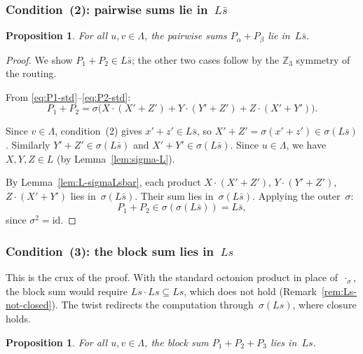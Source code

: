 \documentclass[twoside,english]{paper}
\numberwithin{equation}{section}
\numberwithin{figure}{section}
\newtheorem{proposition}[theorem]{Proposition}
\theoremstyle{definition}
\theoremstyle{remark}
\newcommand{\ZZ}{\mathbb{Z}}
\newcommand{\LL}{\Lambda}             %
\begin{document}
\subsubsection{Condition~(2): pairwise sums lie
in~\texorpdfstring{$L\bar{s}$}{L s-bar}}

\begin{proposition}\label{prop:cond2}
For all $u, v \in \LL$, the pairwise sums $P_\alpha + P_\beta$ lie
in~$L\bar{s}$.
\end{proposition}

\begin{proof}
We show $P_1 + P_2 \in L\bar{s}$; the other two cases follow by the
$\ZZ_3$ symmetry of the routing.

From \eqref{eq:P1-std}--\eqref{eq:P2-std}:
\begin{equation}\label{eq:disp3}
  P_1 + P_2 = \sigma\bigl(X \cdot (X' + Z') + Y \cdot (Y' + Z')
    + Z \cdot (X' + Y')\bigr).
\end{equation}

Since $v \in \LL$, condition~(2) gives $x' + z' \in L\bar{s}$, so
$X' + Z' = \sigma(x' + z') \in \sigma(L\bar{s})$.  Similarly
$Y' + Z' \in \sigma(L\bar{s})$ and $X' + Y' \in \sigma(L\bar{s})$.
Since $u \in \LL$, we have $X, Y, Z \in L$ (by Lemma~\ref{lem:sigma-L}).

By Lemma~\ref{lem:L-sigmaLsbar}, each product $X \cdot (X'+Z')$, $Y \cdot (Y'+Z')$,
$Z \cdot (X'+Y')$ lies in~$\sigma(L\bar{s})$.  Their sum lies
in~$\sigma(L\bar{s})$.  Applying the outer~$\sigma$:
\begin{equation}\label{eq:disp4}
  P_1 + P_2 \in \sigma(\sigma(L\bar{s})) = L\bar{s},
\end{equation}
since $\sigma^2 = \mathrm{id}$.
\end{proof}

\subsubsection{Condition~(3): the block sum lies
in~\texorpdfstring{$Ls$}{Ls}}

This is the crux of the proof.  With the standard octonion product in
place of~$\cdot_\sigma$, the block sum would require
$Ls \cdot Ls \subseteq Ls$, which does
not hold (Remark~\ref{rem:Ls-not-closed}).  The twist redirects the
computation through~$\sigma(Ls)$, where closure holds.

\begin{proposition}\label{prop:cond3}
For all $u, v \in \LL$, the block sum $P_1 + P_2 + P_3$ lies in~$Ls$.
\end{proposition}
\end{document}
